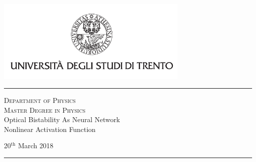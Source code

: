 \begin{titlepage}
\begin{center}

\includegraphics[width=0.7\textwidth]{figures/unitn_logo}
\vspace{3em}

\hrule
\vspace{2em}
{\LARGE \textsc{Department of Physics} \\}
\vspace{1em}
{\LARGE \textsc{Master Degree in Physics} \\}
\vfill
{ \huge %
	Optical Bistability As Neural Network\\
	\vspace{0.5em}
	\huge %
	Nonlinear Activation Function
}
\vfill

\begin{parcolumns}{2}
\end{parcolumns}

\vspace*{3em}
\large 20$^\text{th}$ March 2018\\[0.1cm]
\hrule

\end{center}
\end{titlepage}